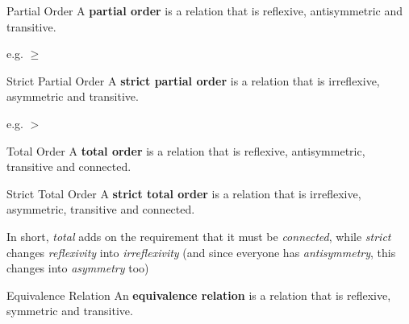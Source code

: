 \documentclass[a4paper, 10pt]{article}
\begin{document}
\begin{definition} {Partial Order}
    A \textbf{partial order} is a relation that is reflexive, antisymmetric and transitive.

    e.g. \(\geq\)
\end{definition}

\begin{definition} {Strict Partial Order}
    A \textbf{strict partial order} is a relation that is irreflexive, asymmetric and transitive.

    e.g. \(>\)
\end{definition}

\begin{definition} {Total Order}
    A \textbf{total order} is a relation that is reflexive, antisymmetric, transitive and connected.
\end{definition}

\begin{definition} {Strict Total Order}
    A \textbf{strict total order} is a relation that is irreflexive, asymmetric, transitive and connected.
\end{definition}

\begin{remark}
    In short, \textit{total} adds on the requirement that it must be \textit{connected}, while \textit{strict} changes \textit{reflexivity} into \textit{irreflexivity} (and since everyone has \textit{antisymmetry}, this changes into \textit{asymmetry} too)
\end{remark}
\begin{definition} {Equivalence Relation}
    An \textbf{equivalence relation} is a relation that is reflexive, symmetric and transitive.
\end{definition}
\end{document}
